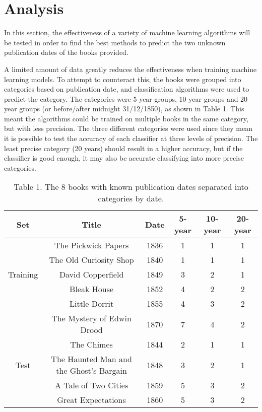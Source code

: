 \documentclass[11pt,a4paper,reqno]{amsart}
\begin{document}
\section{Analysis}%

In this section, the effectiveness of a variety of machine learning algorithms will be tested in order to find the best methods to predict the two unknown publication dates of the books provided.

A limited amount of data greatly reduces the effectiveness when training machine learning models. To attempt to counteract this, the books were grouped into categories based on publication date, and classification algorithms were used to predict the category. The categories were 5 year groups, 10 year groups and 20 year groups (or before/after midnight 31/12/1850), as shown in Table 1. This meant the algorithms could be trained on multiple books in the same category, but with less precision. The three different categories were used since they mean it is possible to test the accuracy of each classifier at three levels of precision. The least precise category (20 years) should result in a higher accuracy, but if the classifier is good enough, it may also be accurate classifying into more precise categories.

\begin{center}
\begin{table}
\begin{tabular}{ |c|c|c|c|c|c| } 
 \hline
 Set & Title & Date & 5-year & 10-year & 20-year \\
 \hline
  & The Pickwick Papers & 1836 & 1 & 1 & 1  \\
  & The Old Curiosity Shop & 1840 & 1 & 1 & 1  \\
 Training & David Copperfield & 1849 & 3 & 2 & 1  \\
  & Bleak House & 1852 & 4 & 2 & 2  \\
  & Little Dorrit & 1855 & 4 & 3 & 2  \\
  & The Mystery of Edwin Drood & 1870 & 7 & 4 & 2  \\
 \hline
  & The Chimes & 1844 & 2 & 1 & 1  \\
 Test & The Haunted Man and the Ghost's Bargain & 1848 & 3 & 2 & 1  \\
  & A Tale of Two Cities & 1859 & 5 & 3 & 2  \\
  & Great Expectations & 1860 & 5 & 3 & 2  \\
 \hline
\end{tabular}
\caption*{Table 1. The 8 books with known publication dates separated into categories by date.}
\end{table}
\end{center}
\end{document}
